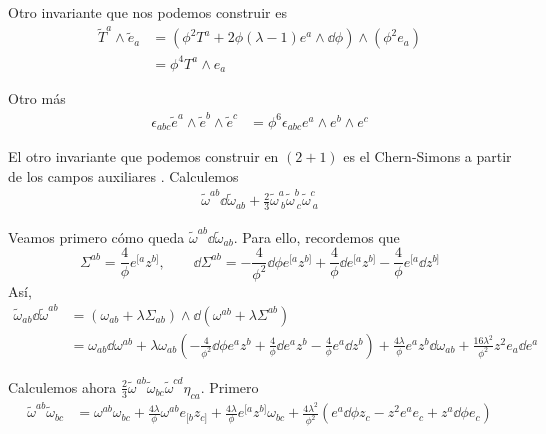 Otro invariante que nos podemos construir es
\begin{align}
  \tilde{T}^{a}\wedge\tilde{e}_a&=\left(\phi^2T^{a}+2\phi (\lambda-1)e^{a}\wedge\dd\phi\right)\wedge \left(\phi^2 e_{a}\right)\\
  &=\phi^4 T^{a}\wedge e_a
\end{align}

Otro más
\begin{align}
  \epsilon_{abc}\tilde{e}^{a}\wedge \tilde{e}^b\wedge \tilde{e}^c&=\phi^6\epsilon_{abc}e^{a}\wedge e^b\wedge e^c
\end{align}

El otro invariante que podemos construir en $(2+1)$ es el Chern-Simons a partir de los campos auxiliares . Calculemos
\begin{align}\label{CS}
  \tilde{\omega}^{ab}\dd\tilde{\omega}_{ab}+\frac{2}{3}\tilde{\omega}^{a}_{~b}\tilde{\omega}^{b}_{~c}\tilde{\omega}^{c}_{~a}
\end{align}

Veamos primero cómo queda $\tilde{\omega}^{ab}\dd\tilde{\omega}_{ab}$. Para ello, recordemos que
\begin{equation}
  \Sigma^{ab}=\frac{4}{\phi}e^{[a}z^{b]},\qquad \dd\Sigma^{ab}=-\frac{4}{\phi^2}\dd\phi e^{[a}z^{b]}+\frac{4}{\phi}\dd e^{[a}z^{b]}-\frac{4}{\phi}e^{[a}\dd z^{b]}
\end{equation}
Así,
\begin{align*}
  \tilde{\omega}_{ab}\dd \tilde{\omega}^{ab}&=(\omega_{ab}+\lambda\Sigma_{ab})\wedge \dd (\omega^{ab}+\lambda\Sigma^{ab})\\
  &=\omega_{ab}\dd\omega^{ab}+\lambda \omega_{ab}\left(-\frac{4}{\phi^2}\dd\phi e^{a}z^b+\frac{4}{\phi}\dd e^{a}z^b-\frac{4}{\phi}e^{a}\dd z^b\right)+\frac{4\lambda}{\phi}e^{a}z^b\dd\omega_{ab}+\frac{16\lambda^2}{\phi^2}z^2e_a\dd e^{a}
\end{align*}

Calculemos ahora $\frac{2}{3}\tilde{\omega}^{ab}\tilde{\omega}_{bc}\tilde{\omega}^{cd}\eta_{ca}$. Primero
\begin{align}
  \tilde{\omega}^{ab}\tilde{\omega}_{bc}&=\omega^{ab}\omega_{bc}+\frac{4\lambda}{\phi}\omega^{ab}e_{[b}z_{c]}+\frac{4\lambda}{\phi}e^{[a}z^{b]}\omega_{bc}+\frac{4\lambda^2}{\phi^2}(e^{a}\dd\phi z_c-z^2e^{a}e_c+z^{a}\dd\phi e_c)
\end{align}

